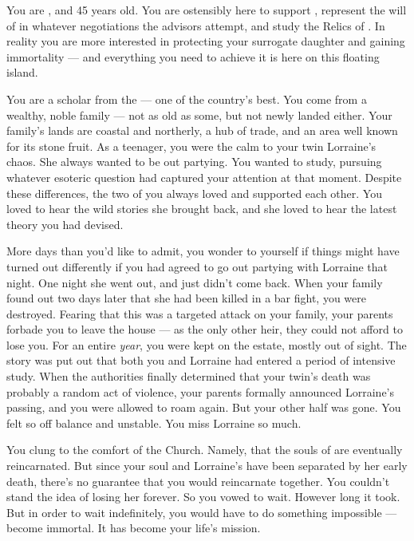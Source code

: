 \documentclass[char]{GL2020}
\begin{document}
\name{\cWildCard{}}

You are \cWildCard{\intro}, and 45 years old. You are ostensibly here to support \cEvil{\full}, represent the will of \cQueen{\full} in whatever negotiations the advisors attempt, and study the Relics of \pEarth{}. In reality you are more interested in protecting your surrogate daughter and gaining immortality — and everything you need to achieve it is here on this floating island.

You are a scholar from the \pFarm{} — one of the country’s best. You come from a wealthy, noble family — not as old as some, but not newly landed either. Your family’s lands are coastal and northerly, a hub of trade, and an area well known for its stone fruit. As a teenager, you were the calm to your twin Lorraine’s chaos. She always wanted to be out partying. You wanted to study, pursuing whatever esoteric question had captured your attention at that moment. Despite these differences, the two of you always loved and supported each other. You loved to hear the wild stories she brought back, and she loved to hear the latest theory you had devised.

More days than you’d like to admit, you wonder to yourself if things might have turned out differently if you had agreed to go out partying with Lorraine that night. One night she went out, and just didn’t come back. When your family found out two days later that she had been killed in a bar fight, you were destroyed. Fearing that this was a targeted attack on your family, your parents forbade you to leave the house — as the only other heir, they could not afford to lose you. For an entire \emph{year}, you were kept on the \cWildCard{\formal} estate, mostly out of sight. The story was put out that both you and Lorraine had entered a period of intensive study. When the authorities finally determined that your twin’s death was probably a random act of violence, your parents formally announced Lorraine’s passing, and you were allowed to roam again. But your other half was gone. You felt so off balance and unstable. You miss Lorraine so much.

You clung to the comfort of the Church. Namely, that the souls of \pFarmers{} are eventually reincarnated. But since your soul and Lorraine’s have been separated by her early death, there’s no guarantee that you would reincarnate together. You couldn’t stand the idea of losing her forever. So you vowed to wait. However long it took. But in order to wait indefinitely, you would have to do something impossible — become immortal. It has become your life’s mission.
\end{document}
